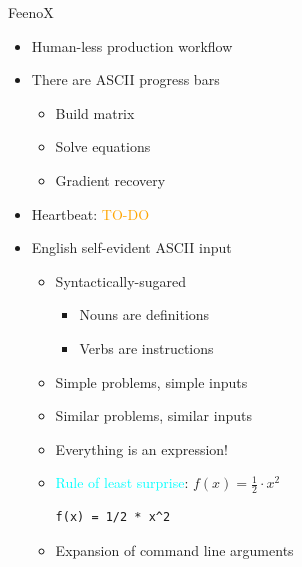 \documentclass[
  ignorenonframetext,
  aspectratio=169,
]{beamer}
\providecommand{\tightlist}{%
  \setlength{\itemsep}{0pt}\setlength{\parskip}{0pt}}
\begin{document}
\begin{frame}[fragile]{}
\begin{columns}[T]
\pause

\begin{column}{0.5\textwidth}
\begin{exampleblock}{FeenoX}
\protect\hypertarget{feenox-7}{}
\begin{itemize}
\tightlist
\item
  Human-less production workflow
\item
  There are ASCII progress bars

  \begin{itemize}
  \tightlist
  \item
    Build matrix
  \item
    Solve equations
  \item
    Gradient recovery
  \end{itemize}
\item
  Heartbeat: \textcolor{Orange}{TO-DO}
\end{itemize}

\medskip

\begin{itemize}
\tightlist
\item
  English self-evident ASCII input

  \begin{itemize}
  \item
    Syntactically-sugared

    \begin{itemize}
    \tightlist
    \item
      Nouns are definitions
    \item
      Verbs are instructions
    \end{itemize}
  \item
    Simple problems, simple inputs
  \item
    Similar problems, similar inputs
  \item
    Everything is an expression!
  \item
    {\textcolor{cyan}{Rule of {least surprise}}}:
    \(f(x)=\frac{1}{2} \cdot x^2\)

\begin{lstlisting}[style=feenox]
f(x) = 1/2 * x^2  
\end{lstlisting}
  \item
    Expansion of command line arguments
  \end{itemize}
\end{itemize}
\end{exampleblock}
\end{column}
\end{columns}
\end{frame}
\end{document}

